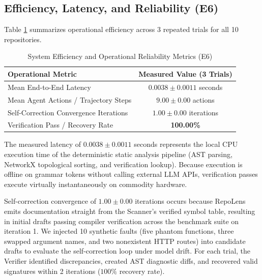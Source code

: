 \documentclass[conference]{IEEEtran}
\begin{document}
\subsection{Efficiency, Latency, and Reliability (E6)}
Table \ref{tab:efficiency} summarizes operational efficiency across 3 repeated trials for all 10 repositories.

\begin{table}[t]
\centering
\caption{System Efficiency and Operational Reliability Metrics (E6)}
\label{tab:efficiency}
\begin{tabular}{lc}
\toprule
\textbf{Operational Metric} & \textbf{Measured Value (3 Trials)} \\
\midrule
Mean End-to-End Latency & $0.0038 \pm 0.0011$ seconds \\
Mean Agent Actions / Trajectory Steps & $9.00 \pm 0.00$ actions \\
Self-Correction Convergence Iterations & $1.00 \pm 0.00$ iterations \\
Verification Pass / Recovery Rate & \textbf{100.00\%} \\
\bottomrule
\end{tabular}
\end{table}

The measured latency of $0.0038 \pm 0.0011$ seconds represents the local CPU execution time of the deterministic static analysis pipeline (AST parsing, NetworkX topological sorting, and verification lookup). Because execution is offline on grammar tokens without calling external LLM APIs, verification passes execute virtually instantaneously on commodity hardware.

Self-correction convergence of $1.00 \pm 0.00$ iterations occurs because RepoLens emits documentation straight from the Scanner's verified symbol table, resulting in initial drafts passing compiler verification across the benchmark suite on iteration 1. We injected 10 synthetic faults (five phantom functions, three swapped argument names, and two nonexistent HTTP routes) into candidate drafts to evaluate the self-correction loop under model drift. For each trial, the Verifier identified discrepancies, created AST diagnostic diffs, and recovered valid signatures within 2 iterations ($100\%$ recovery rate).
\end{document}

